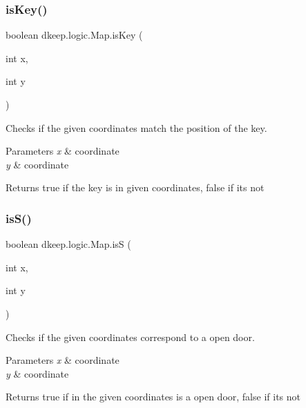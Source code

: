 \subsubsection{\texorpdfstring{is\+Key()}{isKey()}}
{\footnotesize\ttfamily boolean dkeep.\+logic.\+Map.\+is\+Key (\begin{DoxyParamCaption}\item[{int}]{x,  }\item[{int}]{y }\end{DoxyParamCaption})}

Checks if the given coordinates match the position of the key. 
\begin{DoxyParams}{Parameters}
{\em x} & coordinate \\
\hline
{\em y} & coordinate \\
\hline
\end{DoxyParams}
\begin{DoxyReturn}{Returns}
true if the key is in given coordinates, false if it\textquotesingle{}s not 
\end{DoxyReturn}
\mbox{\label{classdkeep_1_1logic_1_1_map_a9af86cd24b6080738ca2059077249ff2}} 
\subsubsection{\texorpdfstring{is\+S()}{isS()}}
{\footnotesize\ttfamily boolean dkeep.\+logic.\+Map.\+isS (\begin{DoxyParamCaption}\item[{int}]{x,  }\item[{int}]{y }\end{DoxyParamCaption})}

Checks if the given coordinates correspond to a open door. 
\begin{DoxyParams}{Parameters}
{\em x} & coordinate \\
\hline
{\em y} & coordinate \\
\hline
\end{DoxyParams}
\begin{DoxyReturn}{Returns}
true if in the given coordinates is a open door, false if it\textquotesingle{}s not 
\end{DoxyReturn}
\mbox{\label{classdkeep_1_1logic_1_1_map_a05fd3c758bc198e790c9f04f2004bcb9}} 
